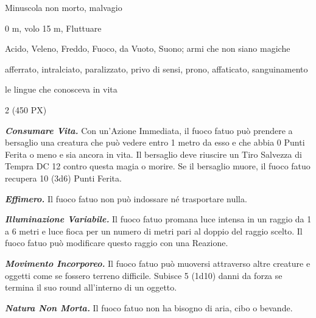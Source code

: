 \begin{multicols}{2}
{
\begin{description}[noitemsep, topsep=0pt, parsep=0pt, partopsep=0pt, itemsep=1pt, leftmargin=2.35cm,  labelwidth=2.2cm, itemindent=0cm, listparindent=0pt] %
\setlength{\baselineskip}{10pt}
\item[\textbf{Taglia/Tipo}] Minuscola non morto, malvagio
\item[\textbf{Caratt.}] 
\item[\textbf{Punti Ferita}] 
\item[\textbf{Movimento}] 0 m, volo 15 m, Fluttuare
\item[\textbf{Tiri Salvez.}] 
\item[\textbf{Res. Danni}] Acido, Veleno, Freddo, Fuoco, da Vuoto, Suono; armi che non siano magiche
\item[\textbf{Immunità}] afferrato, intralciato, paralizzato, privo di sensi, prono, affaticato, sanguinamento
\item[\textbf{Sensi}] 
\item[\textbf{Linguaggi}] le lingue che conosceva in vita
\item[\textbf{Sfida}] 2 (450 PX)
\end{description}
\smallskip

\emph{\textbf{Consumare Vita.}} Con un'Azione Immediata, il fuoco fatuo può prendere a bersaglio una creatura che può vedere entro 1 metro da esso e che abbia 0 Punti Ferita o meno e sia ancora in vita. Il bersaglio deve riuscire un Tiro Salvezza di Tempra DC 12 contro questa magia o morire. Se il bersaglio muore, il fuoco fatuo recupera 10 (3d6) Punti Ferita.

\emph{\textbf{Effimero.}} Il fuoco fatuo non può indossare né trasportare nulla.

\emph{\textbf{Illuminazione Variabile.}} Il fuoco fatuo promana luce intensa in un raggio da 1 a 6 metri e luce fioca per un numero di metri pari al doppio del raggio scelto. Il fuoco fatuo può modificare questo raggio con una Reazione.

\emph{\textbf{Movimento Incorporeo.}} Il fuoco fatuo può muoversi attraverso altre creature e oggetti come se fossero terreno difficile. Subisce 5 (1d10) danni da forza se termina il suo round all'interno di un oggetto.

\emph{\textbf{Natura Non Morta.}} Il fuoco fatuo non ha bisogno di aria, cibo o bevande.

}
\end{multicols}
